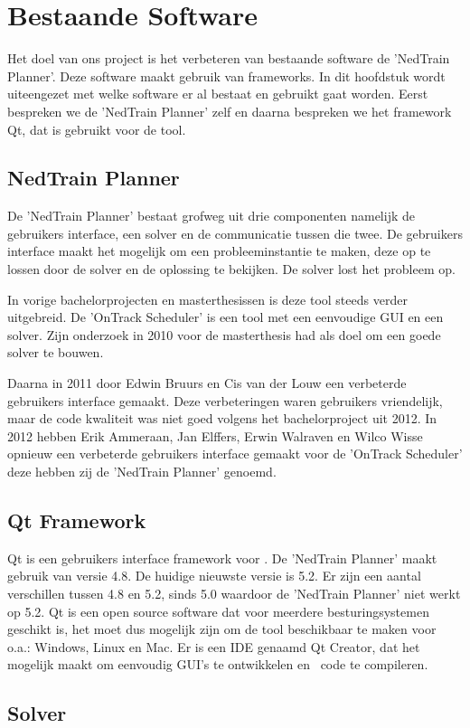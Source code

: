 \section{Bestaande Software}
Het doel van ons project is het verbeteren van bestaande software de 'NedTrain Planner'. Deze software maakt gebruik van frameworks. In dit hoofdstuk wordt uiteengezet met welke software er al bestaat en gebruikt gaat worden. Eerst bespreken we de 'NedTrain Planner' zelf en daarna bespreken we het framework Qt, dat is gebruikt voor de tool. 

\subsection{NedTrain Planner}
De 'NedTrain Planner' bestaat grofweg uit drie componenten namelijk de gebruikers interface, een solver en de communicatie tussen die twee. De gebruikers interface maakt het mogelijk om een probleeminstantie te maken, deze op te lossen door de solver en de oplossing te bekijken. De solver lost het probleem op.

In vorige bachelorprojecten en masterthesissen is deze tool steeds verder uitgebreid. De 'OnTrack Scheduler' is een tool met een eenvoudige GUI en een solver. Zijn onderzoek in 2010 voor de masterthesis had als doel om een goede solver te bouwen. \cite{ronaldevers2010}

Daarna in 2011 door Edwin Bruurs en Cis van der Louw een verbeterde gebruikers interface gemaakt.\cite{bep2011nedtrain} Deze verbeteringen waren gebruikers vriendelijk, maar de code kwaliteit was niet goed volgens het bachelorproject uit 2012.\cite{bep2012nedtrain} In 2012 hebben Erik Ammeraan, Jan Elffers, Erwin Walraven en Wilco Wisse opnieuw een verbeterde gebruikers interface gemaakt voor de 'OnTrack Scheduler' deze hebben zij de 'NedTrain Planner' genoemd.

\subsection{Qt Framework}
Qt is een gebruikers interface framework voor \cpp . De 'NedTrain Planner' maakt gebruik van versie 4.8. De huidige nieuwste versie is 5.2. Er zijn een aantal verschillen tussen 4.8 en 5.2, sinds 5.0 waardoor de 'NedTrain Planner' niet werkt op 5.2. Qt is een open source software dat voor meerdere besturingsystemen geschikt is, het moet dus mogelijk zijn om de tool beschikbaar te maken voor o.a.: Windows, Linux en Mac. Er is een IDE genaamd Qt Creator, dat het mogelijk maakt om eenvoudig GUI's te ontwikkelen en \cpp\ code te compileren. \cite{seminarium2014}

\subsection{Solver}

